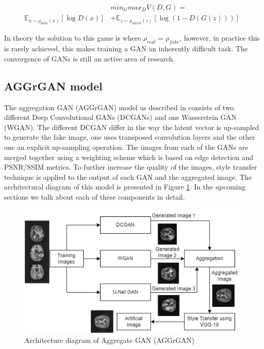 \documentclass[10pt,journal,compsoc]{IEEEtran}
\begin{document}
\begin{align*}
  \label{align*:1}
  & min_{G}max_{D} V(D, G) = \\
  \mathbb{E}_{x \sim \rho_{data}(x)} [\log D(x)] & + \mathbb{E}_{z \sim \rho_{latent}(z)} [\log (1 - D(G(z)))]
\end{align*}


In theory the solution to this game is where $\rho_{real} = \rho_{fake}$, however, in practice this is rarely achieved, this makes training a GAN an inherently difficult task. The convergence of GANs is still an active area of research.

\subsection{AGGrGAN model}

The aggregation GAN (AGGrGAN) model as described in \cite{Mukherkjee2022} consists of two different Deep Convolutional GANs (DCGANs) and one Wasserstein GAN (WGAN).
The different DCGAN differ in the way the latent vector is up-sampled to generate the fake image, one uses transposed convolution layers and the other one an explicit
up-sampling operation. The images from each of the GANs are merged together using a weighting scheme which is based on edge detection and PSNR/SSIM metrics. To further
increase the quality of the images, style transfer technique is applied to the output of each GAN and the aggregated image. The architectural diagram of this model is presented in Figure \ref{figure:1}. In the upcoming sections we talk about each of these components in detail.

\begin{figure}[h]
\includegraphics[scale=0.5]{AggrGAN_architecture.png}
\caption{Architecture diagram of Aggregate GAN (AGGrGAN)}
\label{figure:1}
\end{figure}
\end{document}
